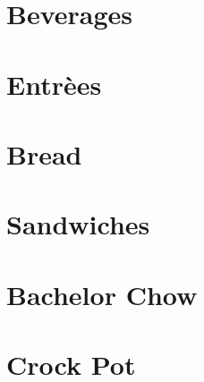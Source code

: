 \chapter{Beverages}
\minitoc
\clearpage


\chapter{Entr\`{e}es}
\minitoc
\clearpage










\chapter{Bread}
\minitoc
\clearpage




\chapter{Sandwiches}
\minitoc
\clearpage


\chapter{Bachelor Chow}
\minitoc
\clearpage




\chapter{Crock Pot}
\minitoc
\clearpage




